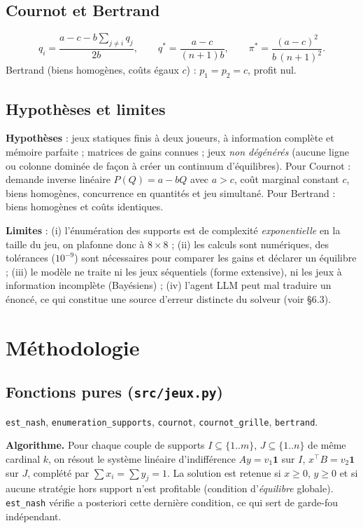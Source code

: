 \documentclass[11pt,a4paper]{article}
\begin{document}
\subsection{Cournot et Bertrand}
\[
q_i=\frac{a-c-b\sum_{j\ne i} q_j}{2b}, \qquad
q^{*}=\frac{a-c}{(n+1)b}, \qquad
\pi^{*}=\frac{(a-c)^2}{b\,(n+1)^2} .
\]
Bertrand (biens homogènes, coûts égaux $c$) : $p_1=p_2=c$, profit nul.

\subsection{Hypothèses et limites}
\textbf{Hypothèses} : jeux statiques finis à deux joueurs, à information complète et
mémoire parfaite ; matrices de gains connues ; jeux \emph{non dégénérés} (aucune ligne ou
colonne dominée de façon à créer un continuum d'équilibres). Pour Cournot : demande inverse
linéaire $P(Q)=a-bQ$ avec $a>c$, coût marginal constant $c$, biens homogènes, concurrence en
quantités et jeu simultané. Pour Bertrand : biens homogènes et coûts identiques.

\textbf{Limites} : (i) l'énumération des supports est de complexité \emph{exponentielle} en
la taille du jeu, on plafonne donc à $8\times8$ ; (ii) les calculs sont numériques, des
tolérances ($10^{-9}$) sont nécessaires pour comparer les gains et déclarer un équilibre ;
(iii) le modèle ne traite ni les jeux séquentiels (forme extensive), ni les jeux à
information incomplète (Bayésiens) ; (iv) l'agent LLM peut mal traduire un énoncé, ce qui
constitue une source d'erreur distincte du solveur (voir §6.3).

\section{Méthodologie}
\subsection{Fonctions pures (\texttt{src/jeux.py})}
\texttt{est\_nash}, \texttt{enumeration\_supports}, \texttt{cournot}, \texttt{cournot\_grille},
\texttt{bertrand}.

\textbf{Algorithme.} Pour chaque couple de supports $I\subseteq\{1..m\}$,
$J\subseteq\{1..n\}$ de même cardinal $k$, on résout le système linéaire d'indifférence
$Ay=v_1\mathbf{1}$ sur $I$, $x^{\top}B=v_2\mathbf{1}$ sur $J$, complété par
$\sum x_i=\sum y_j=1$. La solution est retenue si $x\ge0$, $y\ge0$ et si aucune stratégie
hors support n'est profitable (condition d'\emph{équilibre} globale). \texttt{est\_nash}
vérifie a posteriori cette dernière condition, ce qui sert de garde-fou indépendant.
\end{document}
